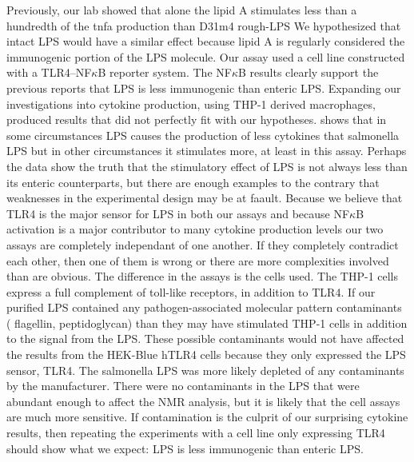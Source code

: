 Previously, our lab showed that alone the \caulobacter{} lipid A stimulates less than a hundredth of the \ac{tnfa} production than \ecoli{} D31m4 rough-\ac{LPS} We hypothesized that intact \caulobacter{} \ac{LPS} would have a similar effect because lipid A is regularly considered the immunogenic portion of the \ac{LPS} molecule. Our  assay used a cell line constructed with a TLR4--NF$\kappa$B reporter system. The NF$\kappa$B results clearly support the previous reports that \caulobacter{} \ac{LPS} is less immunogenic than enteric \ac{LPS}. Expanding our investigations into cytokine production, using THP-1 derived macrophages, produced results that  did not perfectly fit with our hypotheses.  shows that in some  circumstances \caulobacter{} \ac{LPS} causes the production of less cytokines that \ac{salmonella} \ac{LPS} but in other circumstances it stimulates more, at least in this assay. Perhaps the data show the truth that the stimulatory effect of \caulobacter{} \ac{LPS} is not always less than its enteric counterparts, but there are enough examples to the contrary that weaknesses in the experimental design may be at faault. Because we believe that TLR4 is the major sensor for \ac{LPS} in both our assays and because NF$\kappa$B activation is a major contributor to many cytokine production levels our two assays are completely independant of one another. If they completely contradict each other, then one of them is wrong or there are more complexities involved than are obvious. The difference in the assays is the cells used. The THP-1 cells express a full complement of toll-like receptors, in addition to TLR4. If our purified \caulobacter{} \ac{LPS} contained any pathogen-associated molecular pattern contaminants (\eg{} flagellin, peptidoglycan) than they may have stimulated THP-1 cells in addition to the signal from the \ac{LPS}. These possible contaminants would not have affected the results from the HEK-Blue hTLR4 cells because they only expressed the \ac{LPS} sensor, TLR4. The  \ac{salmonella} \ac{LPS} was more likely depleted of any contaminants by the manufacturer. There were no contaminants in the \caulobacter{} \ac{LPS} that were abundant enough to affect the \ac{NMR} analysis, but it is likely that the cell assays are  much more sensitive. If contamination is the culprit of our surprising cytokine results, then repeating the experiments with a cell line only expressing TLR4 should show what we expect: \caulobacter{} \ac{LPS} is less immunogenic than enteric \ac{LPS}.